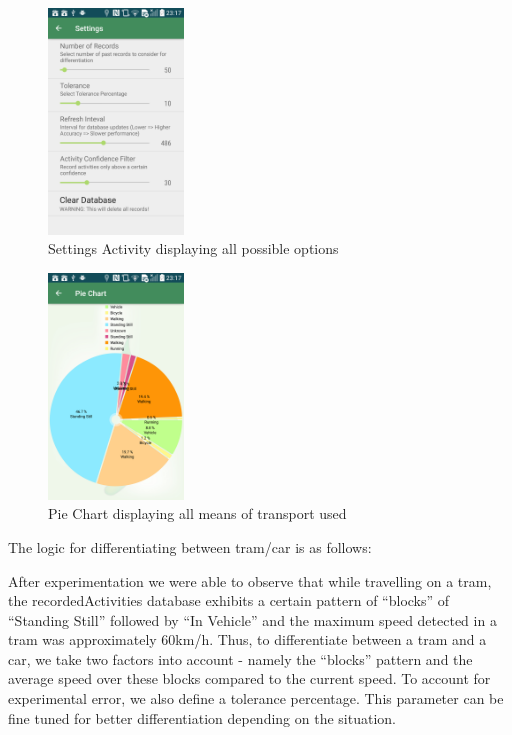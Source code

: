 \documentclass[10pt,conference,compsocconf]{IEEEtran}
\begin{document}
\begin{figure}[h]
	\centering
	\includegraphics[width=\columnwidth, height=6cm, keepaspectratio]{ressources/SettingsActivity.png}
	\vspace{0em} %
	\caption{Settings Activity displaying all possible options}
	\label{fig:settings}
\end{figure}

\begin{figure}[h]
	\centering
	\includegraphics[width=\columnwidth, height=6cm, keepaspectratio]{ressources/PieChartActivity.png}
	\vspace{0em} %
	\caption{Pie Chart displaying all means of transport used}
	\label{fig:piechart}
\end{figure}


The logic for differentiating between tram/car is as follows:

After experimentation we were able to observe that while travelling on a tram, the recordedActivities database exhibits a certain pattern of “blocks” of “Standing Still” followed by “In Vehicle” and the maximum speed detected in a tram was approximately 60km/h. Thus, to differentiate between a tram and a car, we take two factors into account - namely the “blocks” pattern and the average speed over these blocks compared to the current speed. To account for experimental error, we also define a tolerance percentage. This parameter can be fine tuned for better differentiation depending on the situation.
\end{document}
